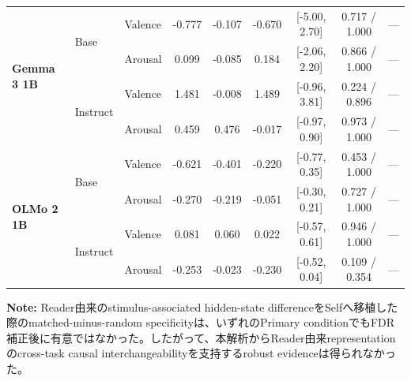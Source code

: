 \begin{table}[htbp]
\begin{tabular}{lll ccccc c}
\midrule
\multirow{4}{*}{\textbf{Gemma 3 1B}} & \multirow{2}{*}{Base} & Valence  & -0.777           & -0.107           & -0.670           & [-5.00, 2.70]        & 0.717 / 1.000  & ---          \\
                                 &                    & Arousal  & 0.099            & -0.085           & 0.184            & [-2.06, 2.20]        & 0.866 / 1.000  & ---          \\
\cmidrule(lr){2-9}
                                 & \multirow{2}{*}{Instruct} & Valence  & 1.481            & -0.008           & 1.489            & [-0.96, 3.81]        & 0.224 / 0.896  & ---          \\
                                 &                    & Arousal  & 0.459            & 0.476            & -0.017           & [-0.97, 0.90]        & 0.973 / 1.000  & ---          \\
\midrule
\multirow{4}{*}{\textbf{OLMo 2 1B}} & \multirow{2}{*}{Base} & Valence  & -0.621           & -0.401           & -0.220           & [-0.77, 0.35]        & 0.453 / 1.000  & ---          \\
                                 &                    & Arousal  & -0.270           & -0.219           & -0.051           & [-0.30, 0.21]        & 0.727 / 1.000  & ---          \\
\cmidrule(lr){2-9}
                                 & \multirow{2}{*}{Instruct} & Valence  & 0.081            & 0.060            & 0.022            & [-0.57, 0.61]        & 0.946 / 1.000  & ---          \\
                                 &                    & Arousal  & -0.253           & -0.023           & -0.230           & [-0.52, 0.04]        & 0.109 / 0.354  & ---          \\
\bottomrule
\end{tabular}
\vspace{1ex}
\begin{minipage}{\linewidth}
\footnotesize
\textbf{Note:} Reader由来のstimulus-associated hidden-state differenceをSelfへ移植した際のmatched-minus-random specificityは、いずれのPrimary conditionでもFDR補正後に有意ではなかった。したがって、本解析からReader由来representationのcross-task causal interchangeabilityを支持するrobust evidenceは得られなかった。
\end{minipage}
\end{table}